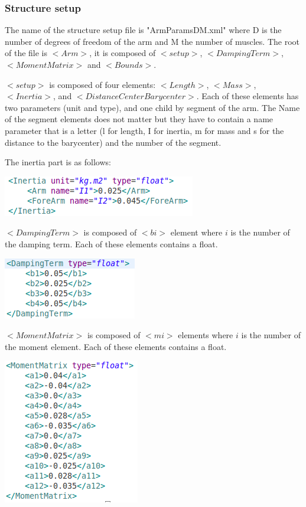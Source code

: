 \documentclass[a4paper]{article}
\begin{document}
\subsubsection{Structure setup}
The name of the structure setup file is "ArmParamsDM.xml" where D is the number of degrees of freedom of the arm and M the number of muscles.
The root of the file is $<Arm>$, it is composed of $<setup>$, $<DampingTerm>$, $<MomentMatrix>$ and $<Bounds>$.

$<setup>$ is composed of four elements: $<Length>$, $<Mass>$, $<Inertia>$, and $<DistanceCenterBarycenter>$. 
Each of these elements has two parameters (unit and type), and one child by segment of the arm.
The Name of the segment elements does not matter but they have to contain a name parameter that is a letter (l for length, I for inertia, m for mass and s for the distance to the barycenter) and the number of the segment.

The inertia part is as follows:
\begin{flushleft}
\includegraphics[scale=0.5]{XMLInertia.png}
\end{flushleft}

$<DampingTerm>$ is composed of $<bi>$ element where $i$ is the number of the damping term. Each of these elements contains a float.
\begin{flushleft}
\includegraphics[scale=0.5]{XMLDamping.png}
\end{flushleft}

$<MomentMatrix>$ is composed of $<mi>$ elements where $i$ is the number of the moment element. Each of these elements contains a float.
\begin{flushleft}
\includegraphics[scale=0.5]{XMLMoment.png}
\end{flushleft}
\end{document}
